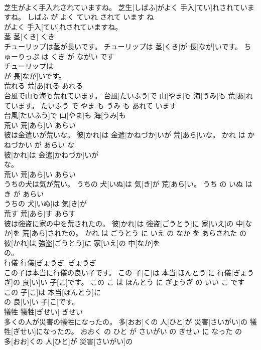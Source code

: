 \documentclass[8pt]{extreport}
\begin{document}
\begin{CJK}{UTF8}{min}
\\	芝生がよく手入れされていますね。	芝生[しばふ]がよく 手入[てい]れされていますね。	しばふ が よく ていれ されて います ね	
\\	がよく 手入[てい]れされていますね。			
\\	茎	茎[くき]	くき	
\\	チューリップは茎が長いです。	チューリップは 茎[くき]が 長[なが]いです。	ちゅーりっぷ は くき が ながい です	
\\	チューリップは
\\	が 長[なが]いです。			
\\	荒れる	荒[あ]れる	あれる	
\\	台風で山も海も荒れています。	台風[たいふう]で 山[やま]も 海[うみ]も 荒[あ]れています。	たいふう で やま も うみ も あれて います	
\\	台風[たいふう]で 山[やま]も 海[うみ]も
\\	荒い	荒[あら]い	あらい	
\\	彼は金遣いが荒いな。	彼[かれ]は 金遣[かねづか]いが 荒[あら]いな。	かれ は かねづかい が あらい な	
\\	彼[かれ]は 金遣[かねづか]いが
\\	な。			
\\	荒い	荒[あら]い	あらい	
\\	うちの犬は気が荒い。	うちの 犬[いぬ]は 気[き]が 荒[あら]い。	うち の いぬ は き が あらい	
\\	うちの 犬[いぬ]は 気[き]が
\\	荒す	荒[あら]す	あらす	
\\	彼は強盗に家の中を荒されたの。	彼[かれ]は 強盗[ごうとう]に 家[いえ]の 中[なか]を 荒[あら]されたの。	かれ は ごうとう に いえ の なか を あらされた の	
\\	彼[かれ]は 強盗[ごうとう]に 家[いえ]の 中[なか]を
\\	の。			
\\	行儀	行儀[ぎょうぎ]	ぎょうぎ	
\\	この子は本当に行儀の良い子です。	この 子[こ]は 本当[ほんとう]に 行儀[ぎょうぎ]の 良[い]い 子[こ]です。	この こ は ほんとう に ぎょうぎ の いい こ です	
\\	この 子[こ]は 本当[ほんとう]に
\\	の 良[い]い 子[こ]です。			
\\	犠牲	犠牲[ぎせい]	ぎせい	
\\	多くの人が災害の犠牲になったの。	多[おお]くの 人[ひと]が 災害[さいがい]の 犠牲[ぎせい]になったの。	おおく の ひと が さいがい の ぎせい に なった の	
\\	多[おお]くの 人[ひと]が 災害[さいがい]の

\end{CJK}
\end{document}
